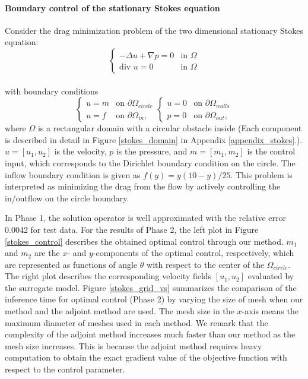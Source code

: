 \documentclass[letterpaper]{article}
\begin{document}
\paragraph{Boundary control of the stationary Stokes equation}
Consider the drag minimization problem of the two dimensional stationary Stokes equation:
\begin{equation}\label{stokes_governing}
  \begin{cases}
        - \Delta u + \nabla p = 0 & \text{in } \Omega\\
    \text{div } u = 0 & \text{in } \Omega
  \end{cases}
\end{equation}\\
with boundary conditions
\begin{equation}
    \begin{cases}
        u = m & \text{on } \partial \Omega_{circle} \\
        u = f & \text{on } \partial \Omega_{in},
    \end{cases}
    \begin{cases}
        u = 0 & \text{on } \partial \Omega_{walls} \\
        p = 0 & \text{on } \partial \Omega_{out},
    \end{cases}
\end{equation}
where $\Omega$ is a rectangular domain with a circular obstacle inside (Each component is described in detail in Figure \ref{stokes_domain} in Appendix \ref{appendix_stokes}.).
$u = [u_1, u_2]$ is the velocity, $p$ is the pressure, and $m = [m_1, m_2]$ is the control input, which corresponds to the Dirichlet boundary condition on the circle. The inflow boundary condition is given as $f(y) = y(10-y)/25$. This problem is interpreted as minimizing the drag from the flow by actively controlling the in/outflow on the circle boundary.

In Phase 1, the solution operator is well approximated with the relative error 0.0042 for test data. For the results of Phase 2, the left plot in Figure \ref{stokes_control} describes the obtained optimal control through our method. $m_1$ and $m_2$ are the $x$- and $y$-components of the optimal control, respectively, which are represented as functions of angle $\theta$ with respect to the center of the $\Omega_{circle}$. The right plot describes the corresponding velocity fields $[u_1, u_2]$ evaluated by the surrogate model.
Figure \ref{stokes_grid_vs} summarizes the comparison of the inference time for optimal control (Phase 2) by varying the size of mesh when our method and the adjoint method are used. The mesh size in the $x$-axis means the maximum diameter of meshes used in each method. We remark that the complexity of the adjoint method increases much faster than our method as the mesh size increases. This is because the adjoint method requires heavy computation to obtain the exact gradient value of the objective function with respect to the control parameter.
\end{document}
